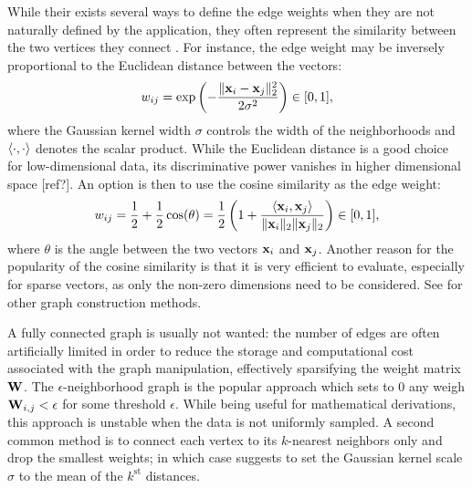 While their exists several ways to define the edge weights when they are not naturally defined by the application, they often represent the similarity between the two vertices they connect \cite{pierre2013graphs}. For instance, the edge weight may be inversely proportional to the Euclidean distance between the vectors:
\begin{equation}
	w_{ij} = \exp \left( - \frac{\| \mathbf{x}_i - \mathbf{x}_j \|_2^2}{2\sigma^2} \right) \in [0,1],
\end{equation}
where the Gaussian kernel width $\sigma$ controls the width of the neighborhoods and $\langle \cdot , \cdot \rangle$ denotes the scalar product. While the Euclidean distance is a good choice for low-dimensional data, its discriminative power vanishes in higher dimensional space {\color{red} [ref?]}. An option is then to use the cosine similarity as the edge weight:
\begin{equation}
	w_{ij} = \frac{1}{2} + \frac{1}{2} \cos(\theta) = \frac{1}{2} \left(1 + \frac{\langle \mathbf{x}_i , \mathbf{x}_j \rangle}{\|\mathbf{x}_i\|_2 \|\mathbf{x}_j\|_2} \right) \in [0,1],
\end{equation}
where $\theta$ is the angle between the two vectors $\mathbf{x}_i$ and $\mathbf{x}_j$. Another reason for the popularity of the cosine similarity is that it is very efficient to evaluate, especially for sparse vectors, as only the non-zero dimensions need to be considered. See \cite{grady2010graphs} for other graph
construction methods.

A fully connected graph is usually not wanted: the number of edges are often artificially limited in order to reduce the storage and computational cost associated with the graph manipulation, effectively sparsifying the weight matrix $\mathbf{W}$.
The $\epsilon$-neighborhood graph is the popular approach which sets to 0 any weigh $\mathbf{W}_{i,j} < \epsilon$ for some threshold $\epsilon$. While being useful for mathematical derivations, this approach is unstable when the data is not uniformly sampled.
A second common method is to connect each vertex to its $k$-nearest neighbors only and drop the smallest weights; in which case \cite{zelnik2004scale} suggests to set the Gaussian kernel scale $\sigma$ to the mean of the $k^{\text{st}}$ distances.

